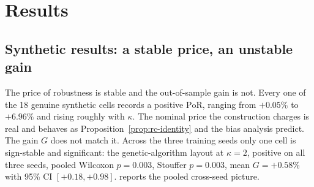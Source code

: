 \documentclass[preprint,review,11pt,authoryear]{elsarticle}
\begin{document}
\section{Results}\label{sec:rc-results}

\subsection{Synthetic results: a stable price, an unstable gain}\label{sec:rc-syn}

The price of robustness is stable and the out-of-sample gain is not. Every one of the 18 genuine synthetic cells records a positive $\mathrm{PoR}$, ranging from $+0.05\%$ to $+6.96\%$ and rising roughly with $\kappa$. The nominal price the construction charges is real and behaves as Proposition~\ref{prop:rc-identity} and the bias analysis predict. The gain $G$ does not match it. Across the three training seeds only one cell is sign-stable and significant: the genetic-algorithm layout at $\kappa=2$, positive on all three seeds, pooled Wilcoxon $p=0.003$, Stouffer $p=0.003$, mean $G=+0.58\%$ with 95\% CI $[+0.18, +0.98]$.  reports the pooled cross-seed picture.
\end{document}
